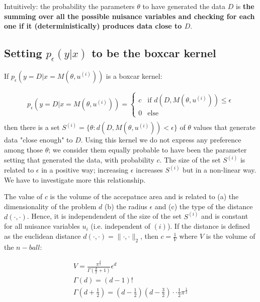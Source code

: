 \documentclass{article}
\newcommand{\norm}[1]{\lVert#1\rVert_2}
\begin{document}
Intuitively: the probability the parameters $\theta$ to have generated the data $D$ is \textbf{the summing over all the possible nuisance variables and checking for each one if it (deterministically) produces data close to $D$}.


\subsection*{Setting $p_{\epsilon}(y|x)$ to be the boxcar kernel}

If $p_\epsilon(y=D|x=M(\theta,u^{(i)}))$ is a boxcar kernel:

\begin{gather}
  p_\epsilon(y=D|x=M(\theta,u^{(i)})) = \left\{
	\begin{array}{ll}
		c  & \mbox{if } d(D, M(\theta, u^{(i)})) \leq \epsilon \\
		0 & \mbox{else } 
	\end{array}
  \right. \\
\end{gather}
%
then there is a set $S^{(i)} = \{ \theta: d(D, M(\theta, u^{(i)})) < \epsilon \}$ of $\theta$ values that generate data "close enough" to $D$. Using this kernel we do not express any preference among those $\theta$; we consider them equally probable to have been the parameter setting that generated the data, with probability $c$. The size of the set $S^{(i)}$ is related to $\epsilon$ in a positive way; increasing $\epsilon$ increases $S^{(i)}$ but in a non-linear way. We have to investigate more this relationship.

The value of $c$ is the volume of the accepatnce area and is related to (a) the dimensionality of the problem $d$ (b) the radius $\epsilon$ and (c) the type of the distance $d(\cdot, \cdot)$. Hence, it is independendent of the size of the set $S^{(i)}$ and is constant for all nuisance variables $u_i$ (i.e. independent of $(i)$). If the distance is defined as the euclidean distance $d(\cdot, \cdot) = \norm{\cdot, \cdot}$, then $c= \frac{1}{V}$ where $V$ is the volume of the $n-ball$:

  \begin{gather}
    V = \frac{\pi^{\frac{d}{2}}}{\Gamma(\frac{d}{2} +1)}\epsilon^d \\
    \Gamma(d) = (d-1)! \\
    \Gamma(d + \frac{1}{2}) = (d-\frac{1}{2})(d-\frac{3}{2})\cdot \cdot \frac{1}{2}\pi^{\frac{1}{2}}
  \end{gather}
\end{document}
